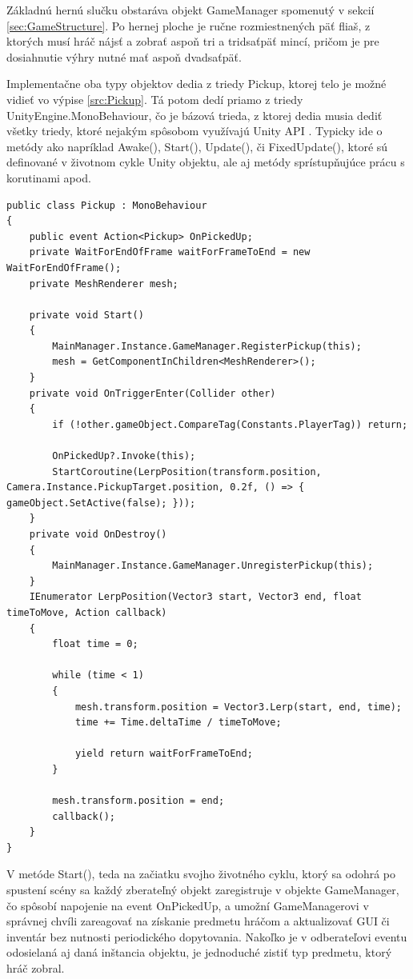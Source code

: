 \documentclass[slovak, master]{diploma}
\begin{document}
Základnú hernú slučku obstaráva objekt GameManager spomenutý v sekcií \ref{sec:GameStructure}. Po hernej ploche je ručne rozmiestnených päť fliaš, z ktorých musí hráč nájsť a zobrať aspoň tri a tridsaťpäť mincí, pričom je pre dosiahnutie výhry nutné mať aspoň dvadsaťpäť. 

Implementačne oba typy objektov dedia z triedy Pickup, ktorej telo je možné vidieť vo výpise \ref{src:Pickup}. Tá potom dedí priamo z triedy UnityEngine.MonoBehaviour, čo je bázová trieda, z ktorej dedia musia dediť všetky triedy, ktoré nejakým spôsobom využívajú Unity API \cite{MonoBehaviour}. Typicky ide o metódy ako napríklad Awake(), Start(), Update(), či FixedUpdate(), ktoré sú definované v životnom cykle Unity objektu, ale aj metódy sprístupňujúce prácu s korutinami apod.
\vspace{8pt}
\begin{lstlisting}[label=src:Pickup,caption={Trieda Pickup slúžiaca ako predok všetkých zberateľných predmetov v hre}]
public class Pickup : MonoBehaviour
{
    public event Action<Pickup> OnPickedUp;
    private WaitForEndOfFrame waitForFrameToEnd = new WaitForEndOfFrame();
    private MeshRenderer mesh;

    private void Start() 
    {
        MainManager.Instance.GameManager.RegisterPickup(this);
        mesh = GetComponentInChildren<MeshRenderer>();
    }
    private void OnTriggerEnter(Collider other) 
    {
        if (!other.gameObject.CompareTag(Constants.PlayerTag)) return;

        OnPickedUp?.Invoke(this);
        StartCoroutine(LerpPosition(transform.position, Camera.Instance.PickupTarget.position, 0.2f, () => { gameObject.SetActive(false); }));
    }
    private void OnDestroy() 
    {
        MainManager.Instance.GameManager.UnregisterPickup(this);
    }
    IEnumerator LerpPosition(Vector3 start, Vector3 end, float timeToMove, Action callback) 
    {
        float time = 0;

        while (time < 1)
        {
            mesh.transform.position = Vector3.Lerp(start, end, time);
            time += Time.deltaTime / timeToMove;

            yield return waitForFrameToEnd;
        }

        mesh.transform.position = end;
        callback();
    }
}
\end{lstlisting}

V metóde Start(), teda na začiatku svojho životného cyklu, ktorý sa odohrá po spustení scény sa každý zberateľný objekt zaregistruje v objekte GameManager, čo spôsobí napojenie na event OnPickedUp, a umožní GameManagerovi v správnej chvíli zareagovať na získanie predmetu hráčom a aktualizovať GUI či inventár bez nutnosti periodického dopytovania. Nakoľko je v odberateľovi eventu odosielaná aj daná inštancia objektu, je jednoduché zistiť typ predmetu, ktorý hráč zobral.
\end{document}
